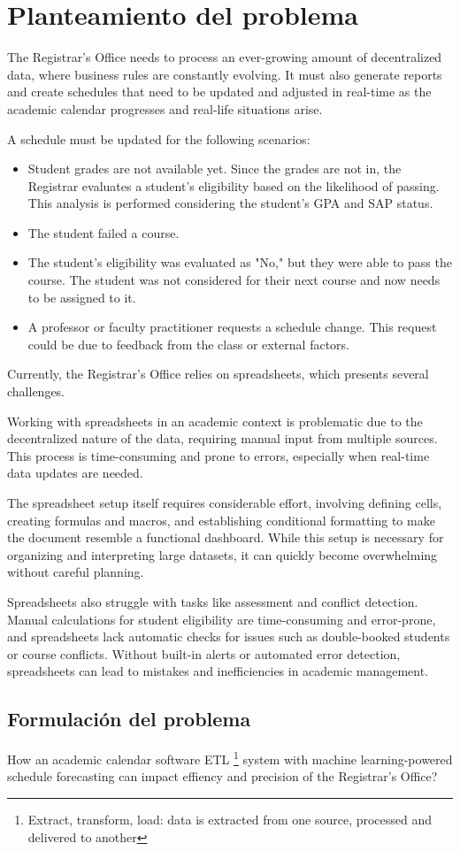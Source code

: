 \section{Planteamiento del problema}

The Registrar's Office needs to process an ever-growing amount of decentralized data, where business rules are constantly evolving. It must also generate reports and create schedules that need to be updated and adjusted in real-time as the academic calendar progresses and real-life situations arise.

A schedule must be updated for the following scenarios:

\begin{itemize}
    \item Student grades are not available yet. Since the grades are not in, the Registrar evaluates a student's eligibility based on the likelihood of passing. This analysis is performed considering the student's GPA and SAP status.
    \item The student failed a course.
    \item The student’s eligibility was evaluated as "No," but they were able to pass the course. The student was not considered for their next course and now needs to be assigned to it.
    \item A professor or faculty practitioner requests a schedule change. This request could be due to feedback from the class or external factors.
\end{itemize}

Currently, the Registrar's Office relies on spreadsheets, which presents several challenges.

Working with spreadsheets in an academic context is problematic due to the decentralized nature of the data, requiring manual input from multiple sources. This process is time-consuming and prone to errors, especially when real-time data updates are needed.

The spreadsheet setup itself requires considerable effort, involving defining cells, creating formulas and macros, and establishing conditional formatting to make the document resemble a functional dashboard. While this setup is necessary for organizing and interpreting large datasets, it can quickly become overwhelming without careful planning.

Spreadsheets also struggle with tasks like assessment and conflict detection. Manual calculations for student eligibility are time-consuming and error-prone, and spreadsheets lack automatic checks for issues such as double-booked students or course conflicts. Without built-in alerts or automated error detection, spreadsheets can lead to mistakes and inefficiencies in academic management.

\subsection{Formulación del problema}
How an academic calendar software ETL \footnote{Extract, transform, load: data is extracted from one source, processed and delivered to another} system with machine learning-powered schedule forecasting can impact effiency and precision of the Registrar's Office?
